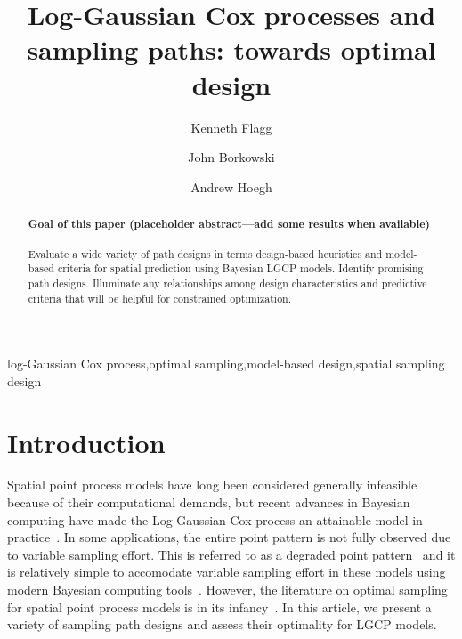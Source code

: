 \documentclass[review]{elsarticle}
\begin{document}
\begin{frontmatter}

\title{Log-Gaussian Cox processes and sampling paths: towards optimal design}

\author[msuaddr]{Kenneth Flagg}

\author[msuaddr]{John Borkowski}
\author[msuaddr]{Andrew Hoegh}

\address[msuaddr]{Department of Mathematical Sciences, Montana State University, Bozeman, MT 59717}

\begin{abstract}

\paragraph{Goal of this paper (placeholder abstract---add some results when
available)} Evaluate a wide variety of path designs in terms design-based
heuristics and model-based criteria for spatial prediction using Bayesian LGCP
models. Identify promising path designs. Illuminate any relationships among
design characteristics and predictive criteria that will be helpful for
constrained optimization.

\end{abstract}

\begin{keyword}
log-Gaussian Cox process\sep optimal sampling\sep model-based design\sep spatial sampling design
\end{keyword}

\end{frontmatter}

\linenumbers



\section{Introduction}

Spatial point process models have long been considered generally infeasible
because of their computational demands, but recent advances in Bayesian
computing have made the Log-Gaussian Cox process an attainable model in
practice~\citep{rueetal, lindgrenetal, illianetal, simpsonetal}. In some
applications, the entire point pattern is not fully observed due to variable
sampling effort. This is referred to as a degraded point
pattern~\citep{chakrabortyetal} and it is relatively simple to accomodate
variable sampling effort in these models using modern Bayesian computing
tools~\citep{yuanetal}. However, the literature on optimal sampling for spatial
point process models is in its infancy~\citep{liuvanhatalo}. In this article,
we present a variety of sampling path designs and assess their optimality for
LGCP models.
\end{document}
